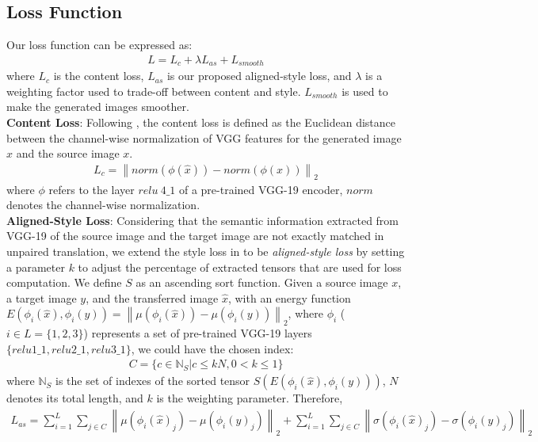\documentclass[runningheads]{llncs}
\begin{document}
\subsection{Loss Function}
\label{sec:Loss}
Our loss function can be expressed as:
\begin{align}
      L = L_c + \lambda L_{as} + L_{smooth}
\end{align}
where $L_c$ is the content loss, $L_{as}$ is our proposed aligned-style loss, and 
$\lambda$ is a weighting factor used to trade-off between content and style. $L_{smooth}$ is used to make the generated images smoother.\\[1ex]
\noindent\textbf{Content Loss}:
Following \cite{huang2017arbitrary}, the content loss is defined as the Euclidean distance between the channel-wise normalization of VGG features for the generated image $\hat{x}$ and the source image $x$.
\begin{align}
      L_{c} = \left \|norm(\phi(\hat{x})) - norm(\phi(x))\right \|_2
\end{align}
where $\phi$ refers to the layer $relu\ 4\_1$ of a pre-trained VGG-19 encoder, $norm$ denotes the channel-wise normalization.\\[1ex]
\noindent\textbf{Aligned-Style Loss}:
Considering that the semantic information extracted from VGG-19 of the source image and the target image are not exactly matched in unpaired translation, we extend the style loss in \cite{huang2017arbitrary} to be \textit{aligned-style loss} by setting a parameter $k$ to adjust the percentage of extracted tensors that are used for loss computation. We define $S$ as an ascending sort function. Given a source image $x$, a target image $y$, and the transferred image $\hat{x}$, with an energy function $E(\phi_i(\hat{x}),\phi_i(y))=\left \|\mu(\phi_i(\hat{x}))-\mu(\phi_i(y)) \right \|_2$, where $\phi_i$ ($i\in L=\{1,2,3\}$) represents a set of pre-trained VGG-19 layers $\{relu1\_1,relu2\_1,relu3\_1\}$, we could have the chosen index:
\begin{align}
      C= \{c \in \mathbb{N}_{S}|c\leqslant kN,0<k\leqslant 1 \}
\end{align}
where $\mathbb{N}_{S}$ is the set of indexes of the sorted tensor $S(E(\phi_i(\hat{x}),\phi_i(y)))$, $N$ denotes its total length, and $k$ is the weighting parameter. Therefore,
\begin{align}
      L_{as} = \sum_{i=1}^L\sum_{j\in C}\left \|\mu(\phi_i(\hat{x})_j) - \mu(\phi_i(y)_j)\right \|_2 + \sum_{i=1}^L\sum_{j\in C}\left \|\sigma(\phi_i(\hat{x})_j) - \sigma(\phi_i(y)_j)\right \|_2
\end{align}
\end{document}

